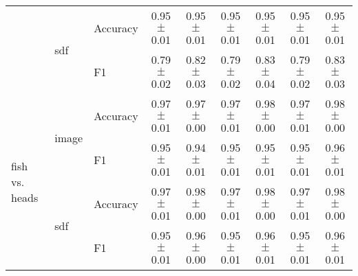 \documentclass[anon,11pt]{9520} %
\begin{document}
\begin{table}
\begin{center}
\begin{tabular}{l|l|l|cc|cc|cc|}
& \multirow{2}{*}{sdf} & \multirow{1}{*}{Accuracy}& 0.95$\pm$0.01& 0.95$\pm$0.01& 0.95$\pm$0.01& 0.95$\pm$0.01& 0.95$\pm$0.01& 0.95$\pm$0.01\\ 
& & \multirow{1}{*}{F1}& 0.79$\pm$0.02& 0.82$\pm$0.03& 0.79$\pm$0.02& 0.83$\pm$0.04& 0.79$\pm$0.02& 0.83$\pm$0.03\\ \cline{2-9} 

\multirow{4}{*}{fish vs. heads}
& \multirow{2}{*}{image} & \multirow{1}{*}{Accuracy}& 0.97$\pm$0.01& 0.97$\pm$0.00& 0.97$\pm$0.01& 0.98$\pm$0.00& 0.97$\pm$0.01& 0.98$\pm$0.00\\ 
& & \multirow{1}{*}{F1}& 0.95$\pm$0.01& 0.94$\pm$0.01& 0.95$\pm$0.01& 0.95$\pm$0.01& 0.95$\pm$0.01& 0.96$\pm$0.01\\ \cline{2-9} 

& \multirow{2}{*}{sdf} & \multirow{1}{*}{Accuracy}& 0.97$\pm$0.01& 0.98$\pm$0.00& 0.97$\pm$0.01& 0.98$\pm$0.00& 0.97$\pm$0.01& 0.98$\pm$0.00\\ 
& & \multirow{1}{*}{F1}& 0.95$\pm$0.01& 0.96$\pm$0.00& 0.95$\pm$0.01& 0.96$\pm$0.01& 0.95$\pm$0.01& 0.96$\pm$0.01\\ \cline{2-9} 

\end{tabular}
\end{center}
\end{table}
\end{document}
